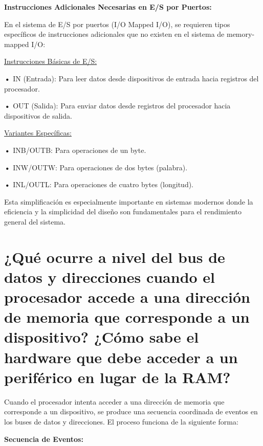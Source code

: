 \documentclass{article}
\begin{document}
\textbf{Instrucciones Adicionales Necesarias en E/S por Puertos: }

\quad

{En el sistema de E/S por puertos (I/O Mapped I/O), se requieren tipos específicos de instrucciones adicionales que no existen en el sistema de memory-mapped I/O:}

\quad

{\underline{Instrucciones Básicas de E/S: }}

\quad

\textbf{    •} { IN (Entrada): Para leer datos desde dispositivos de entrada hacia registros del procesador.}

\textbf{    •} { OUT (Salida): Para enviar datos desde registros del procesador hacia dispositivos de salida.}

\quad

{\underline{Variantes Específicas: }}

\quad

\textbf{    •} { INB/OUTB: Para operaciones de un byte.}

\textbf{    •} { INW/OUTW: Para operaciones de dos bytes (palabra).}

\textbf{    •} {INL/OUTL: Para operaciones de cuatro bytes (longitud).}

\quad

{Esta simplificación es especialmente importante en sistemas modernos donde la eficiencia y la simplicidad del diseño son fundamentales para el rendimiento general del sistema.}

\quad
\newpage






\section{¿Qué ocurre a nivel del bus de datos y direcciones cuando el procesador accede a una dirección de memoria que corresponde a un dispositivo? ¿Cómo sabe el hardware que debe acceder a un periférico en lugar de la RAM?}

\quad

{Cuando el procesador intenta acceder a una dirección de memoria que corresponde a un dispositivo, se produce una secuencia coordinada de eventos en los buses de datos y direcciones. El proceso funciona de la siguiente forma:}

\quad

\textbf{Secuencia de Eventos: }
\end{document}
